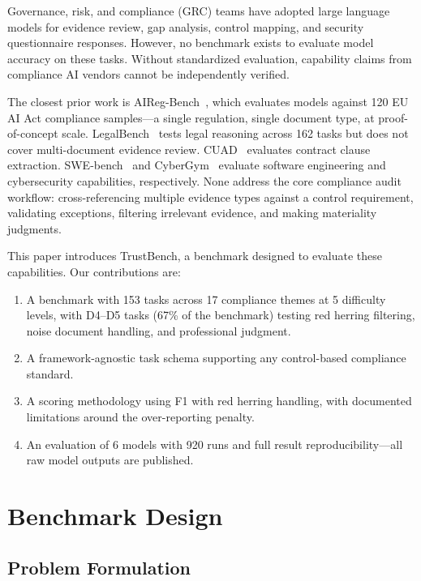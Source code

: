 \documentclass[conference]{IEEEtran}
\begin{document}
Governance, risk, and compliance (GRC) teams have adopted large language models for evidence review, gap analysis, control mapping, and security questionnaire responses. However, no benchmark exists to evaluate model accuracy on these tasks. Without standardized evaluation, capability claims from compliance AI vendors cannot be independently verified.

The closest prior work is AIReg-Bench~\cite{aireg}, which evaluates models against 120 EU AI Act compliance samples---a single regulation, single document type, at proof-of-concept scale. LegalBench~\cite{legalbench} tests legal reasoning across 162 tasks but does not cover multi-document evidence review. CUAD~\cite{cuad} evaluates contract clause extraction. SWE-bench~\cite{swebench} and CyberGym~\cite{cybergym} evaluate software engineering and cybersecurity capabilities, respectively. None address the core compliance audit workflow: cross-referencing multiple evidence types against a control requirement, validating exceptions, filtering irrelevant evidence, and making materiality judgments.

This paper introduces TrustBench, a benchmark designed to evaluate these capabilities. Our contributions are:

\begin{enumerate}
\item A benchmark with 153 tasks across 17 compliance themes at 5 difficulty levels, with D4--D5 tasks (67\% of the benchmark) testing red herring filtering, noise document handling, and professional judgment.
\item A framework-agnostic task schema supporting any control-based compliance standard.
\item A scoring methodology using F1 with red herring handling, with documented limitations around the over-reporting penalty.
\item An evaluation of 6 models with 920 runs and full result reproducibility---all raw model outputs are published.
\end{enumerate}

\section{Benchmark Design}

\subsection{Problem Formulation}
\end{document}
